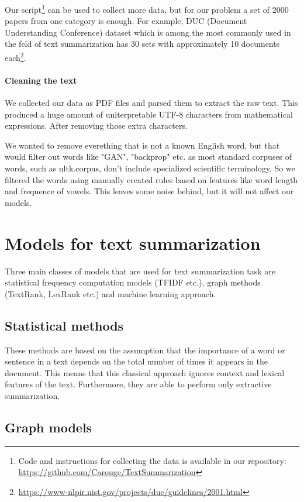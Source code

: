 \documentclass[sigplan]{acmart}
\begin{document}
Our script\footnote{Code and instructions for collecting the data is available in our repository: \url{https://github.com/Carouge/TextSummarization}} can be used to collect more data, but for our problem a set of 2000 papers from one category is enough. For example, DUC (Document Understanding Conference) dataset which is among the most commonly used in the feld of text summarization has 30 sets with approximately 10 documents each\footnote{\url{https://www-nlpir.nist.gov/projects/duc/guidelines/2001.html}}.

\paragraph{Cleaning the text} We collected our data as PDF files and parsed them to extract the raw text. This produced a huge amount of uniterpretable UTF-8 characters from mathematical expressions. After removing those extra characters.

We wanted to remove everething that is not a known English word, but that would filter out words like "GAN", "backprop" etc. as most standard corpuses of words, such as nltk.corpus, don't include specialized scientific terminology. So we filtered the words using manually created rules based on features like word length and frequence of vowels. This leaves some noise behind, but it will not affect our models.

\section{Models for text summarization}

Three main classes of models that are used for text summarization task are statistical frequency computation models (TFIDF etc.), graph methods (TextRank, LexRank etc.) and machine learning approach.

\subsection{Statistical methods}

These methods are based on the assumption that the importance of a word or sentence in a text depends on the total number of times it appears in the document. This means that this classical approach ignores context and lexical features of the text. Furthermore, they are able to perform only extractive summarization.

\subsection{Graph models}
\end{document}
